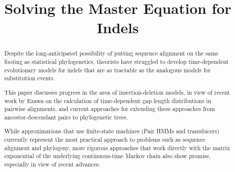 \documentclass{bmcart}
\begin{document}
\begin{frontmatter}

\begin{fmbox}

\title{Solving the Master Equation for Indels}

\author[
   addressref={aff1},                   %
   corref={aff1},                       %
   email={ihh@berkeley.edu}   %
]{ }

\address[id=aff1]{%
  , %
  ,                              %
}


\end{fmbox}%

\begin{abstractbox}

\begin{abstract} %
Despite the long-anticipated possibility of putting sequence alignment on the same footing as statistical phylogenetics,
theorists have struggled to develop time-dependent evolutionary models for indels that are as tractable
as the analogous models for substitution events.

This paper discusses progress in the area of insertion-deletion models,
in view of recent work by Ezawa \cite{Ezawa2016b,Ezawa2016a,Ezawa2016bErratum} on the calculation of time-dependent gap length distributions in pairwise alignments,
and current approaches for extending these approaches from ancestor-descendant pairs to phylogenetic trees.

While approximations that use finite-state machines (Pair HMMs and transducers) currently represent the most practical approach
to problems such as sequence alignment and phylogeny,
more rigorous approaches that work directly with the matrix exponential of the underlying continuous-time Markov chain
also show promise, especially in view of recent advances.
\end{abstract}


\end{abstractbox}
\end{frontmatter}
\end{document}
